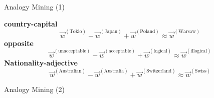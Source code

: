 \begin{vbframe}{Analogy Mining (1)}

\vfill

\textbf{country-capital}
$$\vec w^{(\text{Tokio})} - \vec w^{(\text{Japan})} +  \vec w^{(\text{Poland})} \approx \vec w^{(\text{Warsaw})}$$
\textbf{opposite}
$$\vec w^{(\text{unacceptable})} - \vec w^{(\text{acceptable})} +  \vec w^{(\text{logical})} \approx \vec w^{(\text{illogical})}$$
\textbf{Nationality-adjective}
$$\vec w^{(\text{Australian})} - \vec w^{(\text{Australia})} +  \vec w^{(\text{Switzerland})} \approx \vec w^{(\text{Swiss})}$$

\vfill

\end{vbframe}


\begin{vbframe}{Analogy Mining (2)}

\begin{center}
\end{center}

\end{vbframe}


